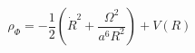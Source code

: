\begin{equation}\label{rho11}
\rho_{\Phi}=-\frac{1}{2}(\dot{R}^{2}+\frac{\Omega^{2}}{a^{6}R^{2}})+V(R)
\end{equation}

